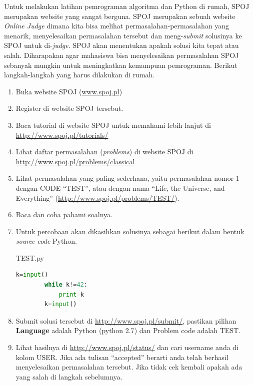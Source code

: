 \begin{pemrograman}
Untuk melakukan latihan pemrograman algoritma dan Python di rumah, SPOJ merupakan website yang sangat berguna. SPOJ merupakan sebuah website \textit{Online Judge} dimana kita bisa melihat permasalahan-permasalahan yang menarik, menyelesaikan permasalahan tersebut dan meng-\textit{submit} solusinya ke SPOJ untuk di-\textit{judge}. SPOJ akan menentukan apakah solusi kita tepat atau salah. Diharapakan agar mahasiswa bisa menyelesaikan permasalahan SPOJ sebanyak mungkin untuk meningkatkan kemampuan pemrograman. Berikut langkah-langkah yang harus dilakukan di rumah.
\begin{enumerate}
	\item Buka website SPOJ (\url{www.spoj.pl})
	\item Register di website SPOJ tersebut.
	\item Baca tutorial di website SPOJ untuk memahami lebih lanjut di \url{http://www.spoj.pl/tutorials/}
	\item Lihat daftar permasalahan (\textit{problems}) di website SPOJ di \url{http://www.spoj.pl/problems/classical}
	\item Lihat permasalahan yang paling sederhana, yaitu permasalahan nomor 1 dengan CODE ``TEST'', atau dengan nama ``Life, the Universe, and Everything'' (\url{http://www.spoj.pl/problems/TEST/}).
	\item Baca dan coba pahami soalnya.
	\item Untuk percobaan akan dikasihkan solusinya sebagai berikut dalam bentuk \textit{source code} Python. 
	\begin{listprog}{TEST.py}
	\label{lst:TEST}
	\begin{lstlisting}[language=Python]
		k=input()
		while k!=42:
			print k
		k=input()
	\end{lstlisting}
	\end{listprog}
	\item Submit solusi tersebut di \url{http://www.spoj.pl/submit/}, pastikan pilihan \textbf{Language} adalah Python (python 2.7) dan Problem code adalah TEST.
	\item Lihat hasilnya di \url{http://www.spoj.pl/status/} dan cari username anda di kolom USER. Jika ada tulisan ``accepted'' berarti anda telah berhasil menyelesaikan permasalahan tersebut. Jika tidak cek kembali apakah ada yang salah di langkah sebelumnya.
\end{enumerate}
\end{pemrograman}
